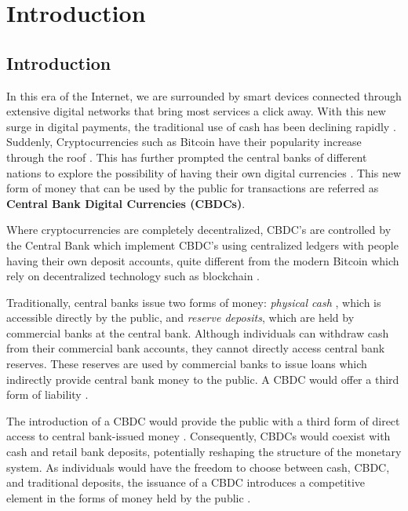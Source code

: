 %


\chapter[Introduction]{Introduction}
\label{chp1}
\section{Introduction}
\label{chp1.1}
In this era of the Internet, we are surrounded by smart devices connected through extensive digital networks that bring most services a click away. With this new surge in digital payments, the traditional use of cash has been declining rapidly \cite{bohme2015bitcoin}. Suddenly, Cryptocurrencies such as Bitcoin have their popularity increase through the roof \cite{narayana2016bitcoin}. This has further prompted the central banks of different nations to explore the possibility of having their own digital currencies \cite{barontini2020}. This new form of money that can be used by the public for transactions are referred as \textbf{Central Bank Digital Currencies (CBDCs)}.

Where cryptocurrencies are completely decentralized, CBDC's are controlled by the Central Bank which implement CBDC's using centralized ledgers \cite{garratt2020} with people having their own deposit accounts, quite different from the modern Bitcoin which rely on decentralized technology such as blockchain \cite{dyson2016}.

Traditionally, central banks issue two forms of money: \textit{physical cash} \cite{kumhof2015},  which is accessible directly by the public, and \textit{reserve deposits}, which are held by commercial banks at the central bank. Although individuals can withdraw cash from their commercial bank accounts, they cannot directly access central bank reserves. These reserves are used by commercial banks to issue loans which indirectly provide central bank money to the public. A CBDC would offer a third form of liability \cite{bains2022}. 

The introduction of a CBDC would provide the public with a third form of direct access to central bank-issued money \cite{mancini2018}. Consequently, CBDCs would coexist with cash and retail bank deposits, potentially reshaping the structure of the monetary system. As individuals would have the freedom to choose between cash, CBDC, and traditional deposits, the issuance of a CBDC introduces a competitive element in the forms of money held by the public 
 \cite{grym2017}.

